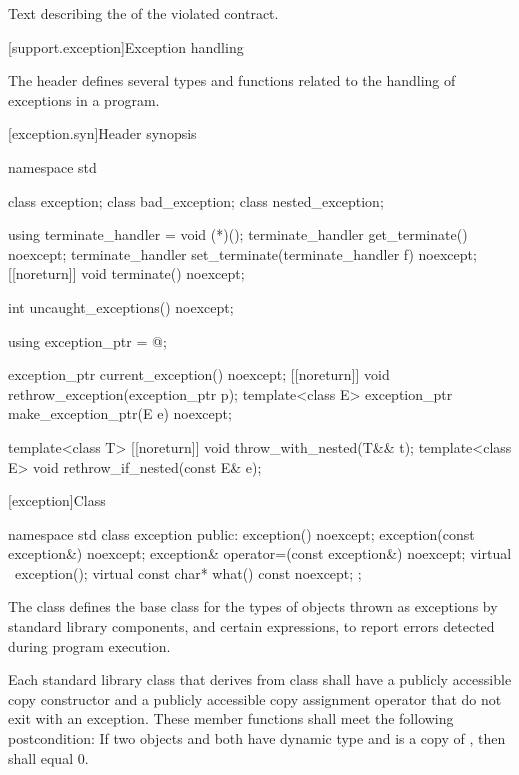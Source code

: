 \begin{itemdescr}
\pnum
\returns Text describing the 
of the violated contract.
\end{itemdescr}

[support.exception]{Exception handling}

\pnum
The header
defines several types and functions related to the handling of exceptions in a \Cpp{} program.

[exception.syn]{Header  synopsis}
%

\begin{codeblock}
namespace std {
  class exception;
  class bad_exception;
  class nested_exception;

  using terminate_handler = void (*)();
  terminate_handler get_terminate() noexcept;
  terminate_handler set_terminate(terminate_handler f) noexcept;
  [[noreturn]] void terminate() noexcept;

  int uncaught_exceptions() noexcept;

  using exception_ptr = @\unspec@;

  exception_ptr current_exception() noexcept;
  [[noreturn]] void rethrow_exception(exception_ptr p);
  template<class E> exception_ptr make_exception_ptr(E e) noexcept;

  template<class T> [[noreturn]] void throw_with_nested(T&& t);
  template<class E> void rethrow_if_nested(const E& e);
}
\end{codeblock}

[exception]{Class }

%
%
\begin{codeblock}
namespace std {
  class exception {
  public:
    exception() noexcept;
    exception(const exception&) noexcept;
    exception& operator=(const exception&) noexcept;
    virtual ~exception();
    virtual const char* what() const noexcept;
  };
}
\end{codeblock}

\pnum
The class
defines the base
class for the types of objects thrown as exceptions by
\Cpp{} standard library components, and certain
expressions, to report errors detected during program execution.

\pnum
Each standard library class  that derives from class  shall have a
publicly accessible copy constructor and a publicly accessible copy assignment
operator that do not exit with an exception. These member functions shall meet
the following postcondition: If two objects  and  both have
dynamic type  and  is a copy of , then
 shall equal 0.

